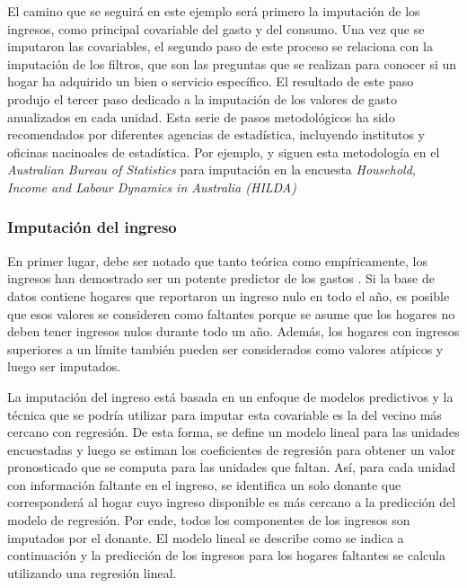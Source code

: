 El camino que se seguirá en este ejemplo será primero la imputación de los ingresos, como principal covariable del gasto y del consumo. Una vez que se imputaron las covariables, el segundo paso de este proceso se relaciona con la imputación de los filtros, que son las preguntas que se realizan para conocer si un hogar ha adquirido un bien o servicio específico. El resultado de este paso produjo el tercer paso dedicado a la imputación de los valores de gasto anualizados en cada unidad. Esta serie de pasos metodológicos ha sido recomendados por diferentes agencias de estadística, incluyendo institutos y oficinas nacinoales de estadística. Por ejemplo, \citet{Hayes_Watson_2009} y \citet{Sun_2010} siguen esta metodología en el \emph{Australian Bureau of Statistics} para imputación en la encuesta \emph{Household, Income and Labour Dynamics in Australia (HILDA)}

\hypertarget{imputacion-del-ingreso}{%
\subsubsection*{Imputación del ingreso}\label{imputacion-del-ingreso}}


En primer lugar, debe ser notado que tanto teórica como empíricamente, los ingresos han demostrado ser un potente predictor de los gastos \citep{Starick_Watson_2011}. Si la base de datos contiene hogares que reportaron un ingreso nulo en todo el año, es posible que esos valores se consideren como faltantes porque se asume que los hogares no deben tener ingresos nulos durante todo un año. Además, los hogares con ingresos superiores a un límite también pueden ser considerados como valores atípicos y luego ser imputados.

La imputación del ingreso está basada en un enfoque de modelos predictivos y la técnica que se podría utilizar para imputar esta covariable es la del vecino más cercano con regresión. De esta forma, se define un modelo lineal para las unidades encuestadas y luego se estiman los coeficientes de regresión para obtener un valor pronosticado que se computa para las unidades que faltan. Así, para cada unidad con información faltante en el ingreso, se identifica un solo donante que corresponderá al hogar cuyo ingreso disponible es más cercano a la predicción del modelo de regresión. Por ende, todos los componentes de los ingresos son imputados por el donante. El modelo lineal se describe como se indica a continuación y la predicción de los ingresos para los hogares faltantes se calcula utilizando una regresión lineal.

